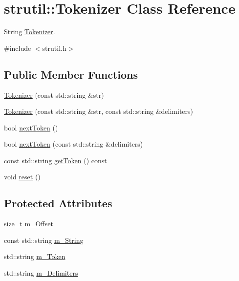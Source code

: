 \hypertarget{classstrutil_1_1_tokenizer}{}\section{strutil\+:\+:Tokenizer Class Reference}
\label{classstrutil_1_1_tokenizer}


String \hyperlink{classstrutil_1_1_tokenizer}{Tokenizer}.  




{\ttfamily \#include $<$strutil.\+h$>$}

\subsection*{Public Member Functions}
\begin{DoxyCompactItemize}
\item 
\hyperlink{classstrutil_1_1_tokenizer_a06d65cfd0ab81dce63d6c4cb4ca5fe06}{Tokenizer} (const std\+::string \&str)
\item 
\hyperlink{classstrutil_1_1_tokenizer_adb3ce4fc54a837a6b28f6f5b082a8629}{Tokenizer} (const std\+::string \&str, const std\+::string \&delimiters)
\item 
bool \hyperlink{classstrutil_1_1_tokenizer_ab595c59adf60b6fda91f966923adf1e4}{next\+Token} ()
\item 
bool \hyperlink{classstrutil_1_1_tokenizer_a10ea31405b946f0b93f21769859f5168}{next\+Token} (const std\+::string \&delimiters)
\item 
const std\+::string \hyperlink{classstrutil_1_1_tokenizer_a46304b56abf0a2c6a1e763cd84256e4a}{get\+Token} () const 
\item 
void \hyperlink{classstrutil_1_1_tokenizer_aa01a3210ecc1b9bf7e5dce7f0ae1b3a0}{reset} ()
\end{DoxyCompactItemize}
\subsection*{Protected Attributes}
\begin{DoxyCompactItemize}
\item 
size\+\_\+t \hyperlink{classstrutil_1_1_tokenizer_a50ae0ffae10c83504ffbaafd60bb1447}{m\+\_\+\+Offset}
\item 
const std\+::string \hyperlink{classstrutil_1_1_tokenizer_a61e86d8e56aeec3fd927423501a03e8b}{m\+\_\+\+String}
\item 
std\+::string \hyperlink{classstrutil_1_1_tokenizer_a51b24fd77541f9731a8599f61d92bf43}{m\+\_\+\+Token}
\item 
std\+::string \hyperlink{classstrutil_1_1_tokenizer_a9cc01d443fc4eafe269a00551769098d}{m\+\_\+\+Delimiters}
\end{DoxyCompactItemize}


